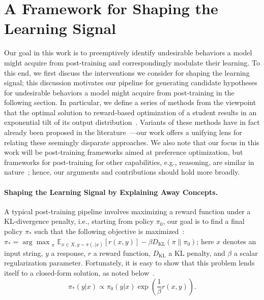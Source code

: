 \documentclass{article} %
\newcommand{\pie}{{\pi}}
\begin{document}
\section{A Framework for Shaping the Learning Signal}

Our goal in this work is to preemptively identify undesirable behaviors a model might acquire from post-training and correspondingly modulate their learning.
% 
To this end, we first discuss the interventions we consider for shaping the learning signal; this discussion motivates our pipeline for generating candidate hypotheses for undesirable behaviors a model might acquire from post-training in the following section.
% 
In particular, we define a series of methods from the viewpoint that the optimal solution to reward-based optimization of a student results in an exponential tilt of its output distribution~\citep{korbak2022rl, rafailov2023direct, azar2024general, ethayarajh2024kto}. 
% 
Variants of these methods have in fact already been proposed in the literature~\citep{chen2025persona, casademunt2025steering, rathi2026shaping, tan2025inoculation, wichers2025inoculation}---our work offers a unifying lens for relating these seemingly disparate approaches.
% 
We also note that our focus in this work will be post-training frameworks aimed at preference optimization, but frameworks for post-training for other capabilities, e.g., reasoning, are similar in nature~\citep{shao2024deepseekmath, kwiatkowski2026likelihood}; hence, our arguments and contributions should hold more broadly.







\paragraph{Shaping the Learning Signal by Explaining Away Concepts.}


A typical post-training pipeline involves maximizing a reward function under a KL-divergence penalty, i.e., starting from policy $\pie_0$, our goal is to find a final policy $\pie_*$ such that the following objective is maximized~\citep{christiano2017deep, ziegler2019fine, bai2022training, wu2021recursively, stiennon2020learning, go2023aligning}: $\pie_* = {\arg\max}_{\pie} \,\, \mathbb{E}_{{x}\in {X}, {y}\sim \pie(.|{x})} \left[r({x}, {y})\right] - \beta D_\text{KL}\left( \pie \| \pie_0 \right)$; 
% 
here $x$ denotes an input string, $y$ a response, $r$ a reward function, $D_{\text{KL}}$ a KL penalty, and $\beta$ a scalar regularization parameter.
% 
Fortunately, it is easy to show that this problem lends itself to a closed-form solution, as noted below~\citep{karan2025reasoning, korbak2022rl, rafailov2023direct}.
\begin{equation}
\label{eq:tilting}
    \pie_*({y}|{x}) \propto \pie_0({y}|{x}) \exp\left(\frac{1}{\beta} r({x}, {y}) \right).
\end{equation}
\end{document}

